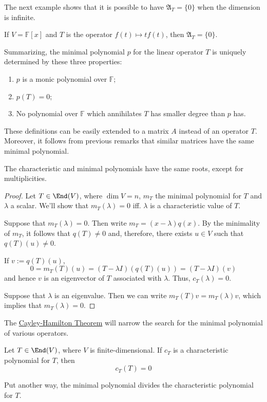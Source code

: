 The next example shows that it is possible to have $\mathfrak{A}_T = \{ 0 \}$ when the dimension is infinite.

\begin{example}
	If $V = \mathbb{F}[x]$ and $T$ is the operator $f(t) \mapsto tf(t)$, then $\mathfrak{A}_T = \{ 0 \}$.
\end{example}

Summarizing, the minimal polynomial $p$ for the linear operator $T$ is uniquely determined by these three properties:
\begin{enumerate}
	\item $p$ is a monic polynomial over $\mathbb{F}$;
	\item $p(T) = 0$;
	\item No polynomial over $\mathbb{F}$ which annihilates $T$ has smaller degree than $p$ has.
\end{enumerate}

These definitions can be easily extended to a matrix $A$ instead of an operator $T$. Moreover, it follows from previous remarks that similar matrices have the same minimal polynomial.

\begin{theorem}
	The characteristic and minimal polynomials have the same roots, except for multiplicities.
\end{theorem}

\begin{proof}
	Let $T \in \End(V)$, where $\dim V = n$, $m_T$ the minimal polynomial for $T$ and $\lambda$ a scalar. We'll show that $m_T(\lambda) = 0$ iff. $\lambda$ is a characteristic value of $T$.

	Suppose that $m_T(\lambda) = 0$. Then write $m_T = (x-\lambda)q(x)$. By the minimality of $m_T$, it follows that $q(T) \neq 0$ and, therefore, there exists $u \in V$ such that $q(T)(u) \neq 0$.
	
	If $v := q(T)(u)$,
	\[
		0 = m_T(T)(u) = (T - \lambda I)(q(T)(u)) = (T - \lambda I)(v)
	\]
	and hence $v$ is an eigenvector of $T$ associated with $\lambda$. Thus, $c_T(\lambda) = 0$.

	Suppose that $\lambda$ is an eigenvalue. Then we can write $m_T(T)v = m_T(\lambda)v$, which implies that $m_T(\lambda) = 0$.
\end{proof}

The \hyperref[thm:cayley-hamilton]{Cayley-Hamilton Theorem} will narrow the search for the minimal polynomial of various operators.

\begin{theorem}\label{thm:cayley-hamilton}
	Let $T \in \End(V)$, where $V$ is finite-dimensional. If $c_T$ is a characteristic polynomial for $T$, then
	\[
		c_T(T) = 0
	\]

	Put another way, the minimal polynomial divides the characteristic polynomial for $T$.
\end{theorem}

